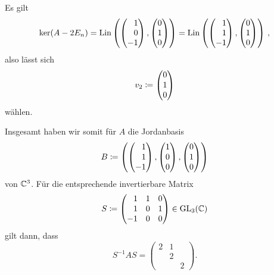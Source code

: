 \documentclass[a4paper,10pt,numbers = noenddot]{scrartcl}
\begin{document}
\begin{example}
\begin{itemize}
\[      \]
      Es gilt
      \[
          \ker (A - 2 E_n)
        = \Lin\left( \columnrvector{1 \\ 0 \\ -1}, \columnvector{0 \\ 1 \\ 0} \right)
        = \Lin\left( \columnrvector{1 \\ 1 \\ -1}, \columnvector{0 \\ 1 \\ 0} \right) \,,
      \]
      also lässt sich
      \[
                  v_2
        \coloneqq \begin{pmatrix} 0 \\ 1 \\ 0 \end{pmatrix}
      \]
      wählen.
  \end{itemize}
  Insgesamt haben wir somit für $A$ die Jordanbasis
  \[
              B
    \defined \left(
                \columnrvector{1 \\ 1 \\ -1},
                \columnvector{1 \\ 0 \\ 0},
                \columnvector{0 \\ 1 \\ 0}
              \right)
  \]
  von $\mathbb{C}^3$.
  Für die entsprechende invertierbare Matrix
  \[
              S
    \defined \begin{pmatrix*}[r]
                 1 &  1 & 0 \\
                 1 &  0 & 1 \\
                -1 &  0 & 0
              \end{pmatrix*}
    \in \GL{3}{\Complex}
  \]
  gilt dann, dass
  \[
      S^{-1} A S
    = \begin{pmatrix}
        2 & 1 &   \\
          & 2 &   \\
          &   & 2
      \end{pmatrix}.
  \]
\end{example}
\end{document}
